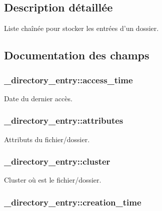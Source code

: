 \subsection{Description détaillée}
Liste chaînée pour stocker les entrées d'un dossier. 

\subsection{Documentation des champs}
\hypertarget{struct__directory__entry_a27e1020c5262094ab3b58759da9660ae}{
\subsubsection[{access\+\_\+time}]{ \+\_\+directory\+\_\+entry\+::access\+\_\+time}}\label{struct__directory__entry_a27e1020c5262094ab3b58759da9660ae}
Date du dernier accès. \hypertarget{struct__directory__entry_a63da8f87e73a3eb30e55b2d405fa35d7}{
\subsubsection[{attributes}]{ \+\_\+directory\+\_\+entry\+::attributes}}\label{struct__directory__entry_a63da8f87e73a3eb30e55b2d405fa35d7}
Attributs du fichier/dossier. \hypertarget{struct__directory__entry_a8c70d9d0c2b2557cba83fb827d5c6e90}{
\subsubsection[{cluster}]{ \+\_\+directory\+\_\+entry\+::cluster}}\label{struct__directory__entry_a8c70d9d0c2b2557cba83fb827d5c6e90}
Cluster où est le fichier/dossier. \hypertarget{struct__directory__entry_a95f0f5ef18bf17f332bd0dc352d62ac4}{
\subsubsection[{creation\+\_\+time}]{ \+\_\+directory\+\_\+entry\+::creation\+\_\+time}}\label{struct__directory__entry_a95f0f5ef18bf17f332bd0dc352d62ac4}
